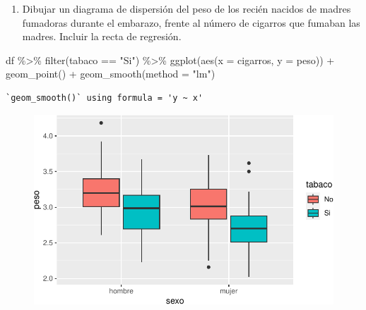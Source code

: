 \documentclass[
  a4paper,
]{scrreport}
\newenvironment{Shaded}{\begin{snugshade}}{\end{snugshade}}
\newcommand{\AttributeTok}[1]{\textcolor[rgb]{0.40,0.45,0.13}{#1}}
\newcommand{\FunctionTok}[1]{\textcolor[rgb]{0.28,0.35,0.67}{#1}}
\newcommand{\NormalTok}[1]{\textcolor[rgb]{0.00,0.23,0.31}{#1}}
\newcommand{\SpecialCharTok}[1]{\textcolor[rgb]{0.37,0.37,0.37}{#1}}
\newcommand{\StringTok}[1]{\textcolor[rgb]{0.13,0.47,0.30}{#1}}
\providecommand{\tightlist}{%
  \setlength{\itemsep}{0pt}\setlength{\parskip}{0pt}}\usepackage{longtable,booktabs,array}
\theoremstyle{definition}
\theoremstyle{definition}
\theoremstyle{remark}
\begin{document}
\begin{enumerate}
\def\labelenumi{\alph{enumi}.}
\setcounter{enumi}{7}
\tightlist
\item
  Dibujar un diagrama de dispersión del peso de los recién nacidos de
  madres fumadoras durante el embarazo, frente al número de cigarros que
  fumaban las madres. Incluir la recta de regresión.
\end{enumerate}

\begin{tcolorbox}[enhanced jigsaw, rightrule=.15mm, bottomrule=.15mm, opacitybacktitle=0.6, leftrule=.75mm, breakable, toptitle=1mm, left=2mm, colbacktitle=quarto-callout-note-color!10!white, colback=white, arc=.35mm, title=\textcolor{quarto-callout-note-color}{\faInfo}\hspace{0.5em}{Solución}, toprule=.15mm, colframe=quarto-callout-note-color-frame, bottomtitle=1mm, opacityback=0, coltitle=black, titlerule=0mm]

\begin{Shaded}
\begin{Highlighting}[]
\NormalTok{df }\SpecialCharTok{\%\textgreater{}\%} 
    \FunctionTok{filter}\NormalTok{(tabaco }\SpecialCharTok{==} \StringTok{"Si"}\NormalTok{) }\SpecialCharTok{\%\textgreater{}\%}
    \FunctionTok{ggplot}\NormalTok{(}\FunctionTok{aes}\NormalTok{(}\AttributeTok{x =}\NormalTok{ cigarros, }\AttributeTok{y =}\NormalTok{ peso)) }\SpecialCharTok{+}
        \FunctionTok{geom\_point}\NormalTok{() }\SpecialCharTok{+}
        \FunctionTok{geom\_smooth}\NormalTok{(}\AttributeTok{method =} \StringTok{"lm"}\NormalTok{)}
\end{Highlighting}
\end{Shaded}

\begin{verbatim}
`geom_smooth()` using formula = 'y ~ x'
\end{verbatim}

\begin{figure}[H]

{\centering \includegraphics{./07-graficos_files/figure-pdf/unnamed-chunk-39-1.pdf}

}

\end{figure}

\end{tcolorbox}
\end{document}
